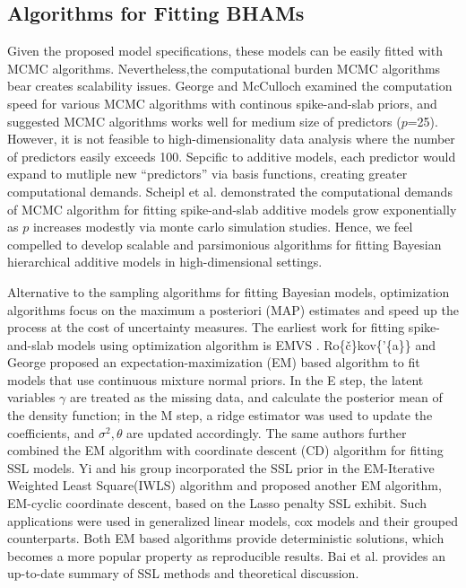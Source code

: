 \documentclass[AMA,STIX1COL,]{WileyNJD-v2}
\begin{document}
\hypertarget{algorithms-for-fitting-bhams}{%
\subsection{Algorithms for Fitting
BHAMs}\label{algorithms-for-fitting-bhams}}

Given the proposed model specifications, these models can be easily
fitted with MCMC algorithms. Nevertheless,the computational burden MCMC
algorithms bear creates scalability issues. George and
McCulloch\citep{George1997} examined the computation speed for various
MCMC algorithms with continous spike-and-slab priors, and suggested MCMC
algorithms works well for medium size of predictors (\(p\)=25). However,
it is not feasible to high-dimensionality data analysis where the number
of predictors easily exceeds 100. Sepcific to additive models, each
predictor would expand to mutliple new ``predictors'' via basis
functions, creating greater computational demands. Scheipl et al.
\citep{Scheipl2013} demonstrated the computational demands of MCMC
algorithm for fitting spike-and-slab additive models grow exponentially
as \(p\) increases modestly via monte carlo simulation studies. Hence,
we feel compelled to develop scalable and parsimonious algorithms for
fitting Bayesian hierarchical additive models in high-dimensional
settings.

Alternative to the sampling algorithms for fitting Bayesian models,
optimization algorithms focus on the maximum a posteriori (MAP)
estimates and speed up the process at the cost of uncertainty measures.
The earliest work for fitting spike-and-slab models using optimization
algorithm is EMVS \citep{Rockova2014a}. Ro\{\v{c}\}kov\{'\{a\}\} and
George\citep{Rockova2014a} proposed an expectation-maximization (EM)
based algorithm to fit models that use continuous mixture normal priors.
In the E step, the latent variables \(\gamma\) are treated as the
missing data, and calculate the posterior mean of the density function;
in the M step, a ridge estimator was used to update the coefficients,
and \(\sigma^2, \theta\) are updated accordingly. The same authors
\citep{Rockova2018b, Rockova2018} further combined the EM algorithm with
coordinate descent (CD) algorithm for fitting SSL models. Yi and his
group incorporated the SSL prior in the EM-Iterative Weighted Least
Square(IWLS) algorithm and proposed another EM algorithm, EM-cyclic
coordinate descent, based on the Lasso penalty SSL exhibit. Such
applications were used in generalized linear models\citep{Tang2017a},
cox models \citep{Tang2017} and their grouped
counterparts\citep{Tang2018, Tang2019}. Both EM based algorithms provide
deterministic solutions, which becomes a more popular property as
reproducible results. Bai et al. \citep{Bai2020} provides an up-to-date
summary of SSL methods and theoretical discussion.
\end{document}

